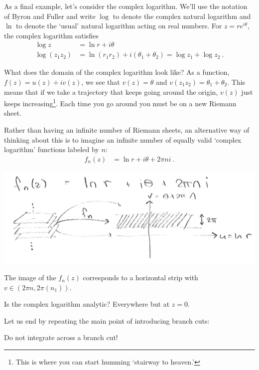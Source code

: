 As a final example, let's consider the complex logarithm. We'll use the notation of Byron and Fuller and write $\log$ to denote the complex natural logarithm and $\ln$ to denote the `usual' natural logarithm acting on real numbers. For $z=r e^{i\theta}$, the complex logarithm satisfies
\begin{align}
	\log z &= \ln r + i \theta
	\\
	\log(z_1z_2)
	&=\ln(r_1r_2) + i (\theta_1+\theta_2)
	= \log z_1 + \log z_2 \ .
\end{align}
\begin{example}
What does the domain of the complex logarithm look like? As a function, $f(z) = u(z) + i v(z)$, we see that $v(z) = \theta$ and $v(z_1z_2)=\theta_1+\theta_2$. This means that if we take a trajectory that keeps going around the origin, $v(z)$ just keeps increasing\footnote{This is where you can start humming `stairway to heaven.'}. Each time you go around you must be on a new Riemann sheet. 
\end{example}
Rather than having an infinite number of Riemann sheets, an alternative way of thinking about this is to imagine an infinite number of equally valid `complex logarithm' functions labeled by $n$:
\begin{align}
	f_n(z) &= \ln r + i \theta + 2\pi n i \ .
\end{align}
\begin{center}
\includegraphics[width=\textwidth]{figures/lec13_map5.png}
\end{center}
The image of the $f_n(z)$ corresponds to a horizontal strip with $v\in \left(2\pi n, 2\pi(n_1)\right)$.
\begin{example}
Is the complex logarithm analytic? Everywhere but at $z=0$.
\end{example}
Let us end by repeating the main point of introducing branch cuts:
\begin{framed}
\begin{center}
Do not integrate across a branch cut!
\end{center}
\end{framed}

